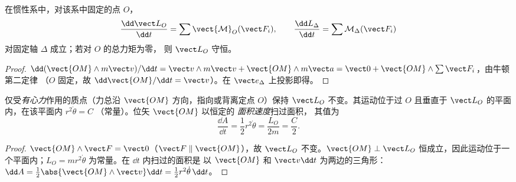 \begin{theorem}[角动量定理]\label{thm:b1:angular-momentum:theorem}
在惯性系中，对该系中固定的点 $O$，
\[
\frac{\dd\vect L_O}{\dd t} = \sum\vect{\mathcal M}_O(\vect F_i),
\qquad
\frac{\dd L_\Delta}{\dd t} = \sum\mathcal M_\Delta(\vect F_i)
\]
对固定轴 $\Delta$ 成立；若对 $O$ 的总力矩为零，
则 $\vect L_O$ 守恒。
\end{theorem}

\begin{proof}
$\dd(\vect{OM}\wedge m\vect v)/\dd t = \vect v\wedge m\vect v + \vect{OM}\wedge m\vect a
= \vect 0 + \vect{OM}\wedge\sum\vect F_i$，由牛顿第二定律
（$O$ 固定，故 $\dd\vect{OM}/\dd t = \vect v$）。在 $\vect e_\Delta$ 上投影即得。
\end{proof}

\begin{corollary}\label{cor:b1:angular-momentum:central}
仅受\emph{有心力}作用的质点（力总沿
$\vect{OM}$ 方向，指向或背离定点 $O$）保持 $\vect L_O$ 不变。其运动位于过 $O$
且垂直于 $\vect L_O$ 的平面内，在该平面内 $r^2\dot\theta = C$
（常量）。位矢 $\vect{OM}$ 以恒定的
\emph{面积速度}扫过面积，
其值为
\[
\frac{\dd A}{\dd t} = \frac12 r^2\dot\theta = \frac{L_O}{2m} = \frac{C}{2} .
\]
\end{corollary}

\begin{proof}
$\vect{OM}\wedge\vect F = \vect 0$（$\vect F \parallel \vect{OM}$），故 $\vect L_O$
不变。$\vect{OM}\perp\vect L_O$ 恒成立，因此运动位于一个平面内；$L_O =
mr^2\dot\theta$ 为常量。在 $\dd t$ 内扫过的面积是
以 $\vect{OM}$ 和 $\vect v\dd t$ 为两边的三角形：$\dd A = \tfrac12\abs{\vect{OM}
\wedge\vect v}\dd t = \tfrac12 r^2\dot\theta\,\dd t$。
\end{proof}

